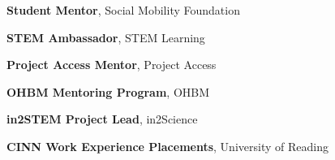 	{\textbf{Student Mentor}, Social Mobility Foundation}

\cvitem{}
	{\textbf{STEM Ambassador}, STEM Learning}

\cvitem{}
	{\textbf{Project Access Mentor}, Project Access}

	{\textbf{OHBM Mentoring Program}, OHBM}

	{\textbf{in2STEM Project Lead}, in2Science}

	{\textbf{CINN Work Experience Placements}, University of Reading}
